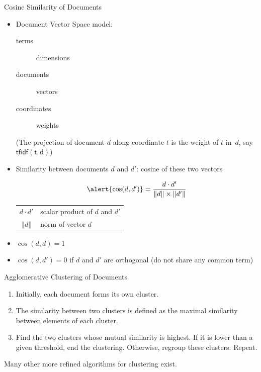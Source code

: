 \begin{frame}{Cosine Similarity of Documents}

\begin{itemize}
\item \alert{Document Vector Space} model:
\begin{description}
\item[terms] dimensions
\item[documents] vectors
\item[coordinates] weights
\end{description}

(The projection of document $d$ along coordinate $t$ is the weight of $t$
in~$d$, say $\mathsf{tf{}idf(t,d)}$)

\item Similarity between documents $d$ and $d'$: \alert{cosine} of these two
vectors

\[
\alert{\cos(d,d')}=\frac{d\cdot d'}{\Vert d\Vert\times\Vert d'\Vert}
\]
\begin{center}\begin{tabular}{cl}
$d\cdot d'$&scalar product of $d$ and $d'$\\
$\Vert d\Vert$&norm of vector $d$
\end{tabular}\end{center}

\item $\cos(d,d)=1$

\item $\cos(d,d')=0$ if $d$ and $d'$ are \alert{orthogonal} (do not
share any common term)
\end{itemize}
\end{frame}

\begin{frame}{Agglomerative Clustering of Documents}

\begin{enumerate}
\item Initially, each document forms \alert{its own cluster}.
\item The similarity between two clusters is defined as the \alert{maximal
similarity} between elements of each cluster.
\item Find the two clusters whose mutual similarity is \alert{highest}. If it is
\alert{lower than a given threshold}, end the clustering. Otherwise, regroup
these clusters. Repeat.
\end{enumerate}

\begin{remark}
Many other more refined algorithms for clustering exist.
\end{remark}

\end{frame}

